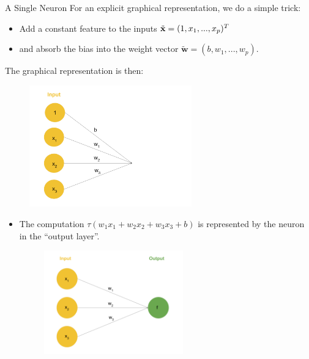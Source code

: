 \begin{vbframe} {A Single Neuron}
For an explicit graphical representation, we do a simple trick: 
\begin{itemize}
\item Add a constant feature to the inputs $\tilde{\mathbf{x}} = (1, x_1, ..., x_p)^T$
\item and absorb the bias into the weight vector $\tilde{\bm{w}} = (b, w_1, ..., w_p)$.
\end{itemize}
The graphical representation is then: 
\begin{figure}
\includegraphics[width=7cm]{figure/neurep_bias.png}
\end{figure}
\framebreak

\begin{itemize}
\item %
The computation $\tau(w_1x_1 + w_2x_2 + w_3x_3 + b)$ is represented by the neuron in the \enquote{output layer}.
\begin{figure}
\includegraphics[width=6cm]{figure/neurep_three.png}
\end{figure}
\framebreak


\end{itemize}
\end{vbframe}
